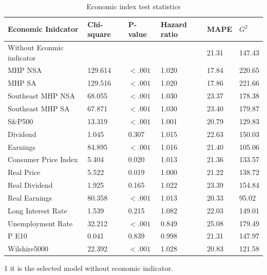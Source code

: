 \documentclass[12pt,letterpaper]{article}
\begin{document}
\begin{table}[htbp]
	\scriptsize
	\centering
	\caption{Economic index test statistics}
	\begin{threeparttable}
	\begin{tabular}{L{3cm}lllll}
		\hline
	    Economic Inidcator & Chi-square  & P-value & Hazard ratio & MAPE  & $G^2$ \\
		\hline
	Without Econmic indicator &       &       &       & 21.31 & 147.43 \\
	MHP NSA & 129.614 & $<.001$ & 1.020  & 17.84 & 220.65 \\
	MHP SA & 129.516 & $<.001$ & 1.020  & 17.86 & 221.66 \\
	Southeast MHP NSA & 68.055 & $<.001$ & 1.030  & 23.37 & 178.38 \\
	Southeast MHP SA & 67.871 & $<.001$& 1.030  & 23.40 & 179.87 \\
	S\&P500 & 13.319 & $<.001$ & 1.001 & 20.79 & 129.83 \\
	Dividend & 1.045 & 0.307 & 1.015 & 22.63 & 150.03 \\
	Earnings & 84.895 & $<.001$ & 1.016 & 21.40 & 105.06 \\
	Consumer Price Index & 5.404 & 0.020 & 1.013 & 21.36 & 133.57 \\
	Real Price & 5.522 & 0.019 & 1.000     & 21.22 & 138.72 \\
	Real Dividend & 1.925 & 0.165 & 1.022 & 23.39 & 154.84 \\
	Real Earnings & 80.358 & $<.001$ & 1.013 & 20.33 & 95.02 \\
	Long Interest Rate & 1.539 & 0.215 & 1.082 & 22.03 & 149.01 \\
	Unemployment Rate & 32.212 & $<.001$ & 0.849 & 25.08 & 179.49 \\
	P E10 & 0.041 & 0.839 & 0.998 & 21.31 & 147.97 \\
	Wilshire5000 & 22.392 & $<.001$ & 1.028 & 20.83 & 121.58 \\
		\hline
	\end{tabular}%
	\begin{tablenotes}
		\item[1] it is the selected model without economic indicator.
	\end{tablenotes}
\end{threeparttable}
	\label{tab:EI}%
\end{table}%
\end{document}
